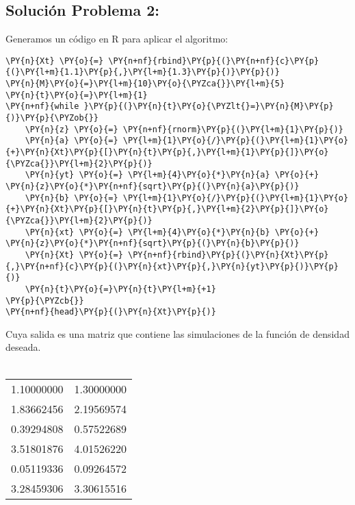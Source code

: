 \subsection*{Solución Problema 2:}
Generamos un código en R para aplicar el algoritmo:

    \begin{tcolorbox}[breakable, size=fbox, boxrule=1pt, pad at break*=1mm,colback=cellbackground, colframe=cellborder]
\begin{Verbatim}[commandchars=\\\{\}]
\PY{n}{Xt} \PY{o}{=} \PY{n+nf}{rbind}\PY{p}{(}\PY{n+nf}{c}\PY{p}{(}\PY{l+m}{1.1}\PY{p}{,}\PY{l+m}{1.3}\PY{p}{)}\PY{p}{)}
\PY{n}{M}\PY{o}{=}\PY{l+m}{10}\PY{o}{\PYZca{}}\PY{l+m}{5}
\PY{n}{t}\PY{o}{=}\PY{l+m}{1}
\PY{n+nf}{while }\PY{p}{(}\PY{n}{t}\PY{o}{\PYZlt{}=}\PY{n}{M}\PY{p}{)}\PY{p}{\PYZob{}}
    \PY{n}{z} \PY{o}{=} \PY{n+nf}{rnorm}\PY{p}{(}\PY{l+m}{1}\PY{p}{)}
    \PY{n}{a} \PY{o}{=} \PY{l+m}{1}\PY{o}{/}\PY{p}{(}\PY{l+m}{1}\PY{o}{+}\PY{n}{Xt}\PY{p}{[}\PY{n}{t}\PY{p}{,}\PY{l+m}{1}\PY{p}{]}\PY{o}{\PYZca{}}\PY{l+m}{2}\PY{p}{)}
    \PY{n}{yt} \PY{o}{=} \PY{l+m}{4}\PY{o}{*}\PY{n}{a} \PY{o}{+} \PY{n}{z}\PY{o}{*}\PY{n+nf}{sqrt}\PY{p}{(}\PY{n}{a}\PY{p}{)}
    \PY{n}{b} \PY{o}{=} \PY{l+m}{1}\PY{o}{/}\PY{p}{(}\PY{l+m}{1}\PY{o}{+}\PY{n}{Xt}\PY{p}{[}\PY{n}{t}\PY{p}{,}\PY{l+m}{2}\PY{p}{]}\PY{o}{\PYZca{}}\PY{l+m}{2}\PY{p}{)}
    \PY{n}{xt} \PY{o}{=} \PY{l+m}{4}\PY{o}{*}\PY{n}{b} \PY{o}{+} \PY{n}{z}\PY{o}{*}\PY{n+nf}{sqrt}\PY{p}{(}\PY{n}{b}\PY{p}{)}
    \PY{n}{Xt} \PY{o}{=} \PY{n+nf}{rbind}\PY{p}{(}\PY{n}{Xt}\PY{p}{,}\PY{n+nf}{c}\PY{p}{(}\PY{n}{xt}\PY{p}{,}\PY{n}{yt}\PY{p}{)}\PY{p}{)}
    \PY{n}{t}\PY{o}{=}\PY{n}{t}\PY{l+m}{+1}
\PY{p}{\PYZcb{}}
\PY{n+nf}{head}\PY{p}{(}\PY{n}{Xt}\PY{p}{)}
\end{Verbatim}
\end{tcolorbox}
\vspace*{2mm}
Cuya salida es una matriz que contiene las simulaciones de la función de densidad deseada.\\
\\
\begin{tabular}{ll}
	 1.10000000 & 1.30000000\\
	 1.83662456 & 2.19569574\\
	 0.39294808 & 0.57522689\\
	 3.51801876 & 4.01526220\\
	 0.05119336 & 0.09264572\\
	 3.28459306 & 3.30615516\\
\end{tabular}\\
